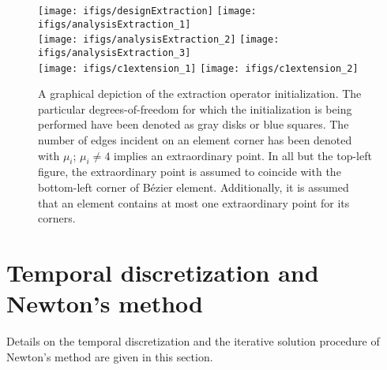 \documentclass[11pt]{article}
\begin{document}
\begin{figure}
	\centering
	\texttt{[image: ifigs/designExtraction]} \hspace{1cm}
	\texttt{[image: ifigs/analysisExtraction\_1]} \\ \vspace{0.5cm}
	\texttt{[image: ifigs/analysisExtraction\_2]} \hspace{1cm}
	\texttt{[image: ifigs/analysisExtraction\_3]} \\ \vspace{0.5cm}
	\texttt{[image: ifigs/c1extension\_1]} \hspace{1cm}
	\texttt{[image: ifigs/c1extension\_2]}
	\caption{A graphical depiction of the extraction operator initialization. The particular degrees-of-freedom for which the initialization is being performed have been denoted as gray disks or blue squares. The number of edges incident on an element corner has been denoted with $\mu_i$; $\mu_i \neq 4$ implies an extraordinary point. In all but the top-left figure, the extraordinary point is assumed to coincide with the bottom-left corner of B\'ezier element. Additionally, it is assumed that an element contains at most one extraordinary point for its corners.}
	\label{fig:extractionInitialization}
\end{figure}


\section{Temporal discretization and Newton's method}
Details on the temporal discretization and the iterative solution procedure of Newton's method are given in this section. 
\end{document}
